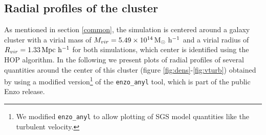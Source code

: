 \subsection{Radial profiles of the cluster}
As mentioned in section \ref{common}, the simulation is centered around a
galaxy cluster with a virial mass of $M_{vir}=\unit[5.49 \times
10^{14}]{M_{\odot}\ h^{-1}}$ and a virial radius of $R_{vir}=\unit[1.33]{Mpc\
h^{-1}}$ for both simulations, which center is identified using the
HOP algorithm. In the following we present plots of radial profiles of several
quantities around the center of this cluster (figure
\ref{fig:dens}-\ref{fig:vturb})
obtained by using a modified version\footnote{We modified \texttt{enzo\_anyl} to
allow plotting of SGS model quantities like the turbulent velocity.} of the
\texttt{enzo\_anyl} tool, which is part of the public Enzo release.   
